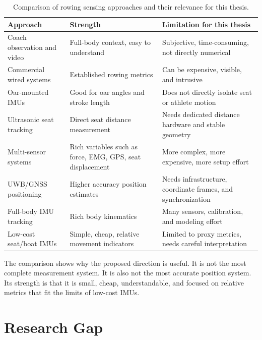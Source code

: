 \begin{table}[htbp]
  \centering
  \caption{Comparison of rowing sensing approaches and their relevance for this thesis.}
  \label{tab:approach-comparison}
  \begin{tabular}{p{} p{} p{}}
    \hline
    Approach & Strength & Limitation for this thesis \\
    \hline
    Coach observation and video & Full-body context, easy to understand & Subjective, time-consuming, not directly numerical \\
    Commercial wired systems & Established rowing metrics & Can be expensive, visible, and intrusive \cite{llosa_remote_2009} \\
    Oar-mounted IMUs & Good for oar angles and stroke length & Does not directly isolate seat or athlete motion \cite{gravenhorst_validation_2013} \\
    Ultrasonic seat tracking & Direct seat distance measurement & Needs dedicated distance hardware and stable geometry \cite{gravenhorst_sonicseat_2012} \\
    Multi-sensor systems & Rich variables such as force, EMG, GPS, seat displacement & More complex, more expensive, more setup effort \cite{hohmuth_wireless_2023} \\
    UWB/GNSS positioning & Higher accuracy position estimates & Needs infrastructure, coordinate frames, and synchronization \cite{rodriguez_mendoza_wearable_2024} \\
    Full-body IMU tracking & Rich body kinematics & Many sensors, calibration, and modeling effort \cite{ruffaldi_sensor_2015} \\
    Low-cost seat/boat IMUs & Simple, cheap, relative movement indicators & Limited to proxy metrics, needs careful interpretation \\
    \hline
  \end{tabular}
\end{table}

The comparison shows why the proposed direction is useful. It is not the most complete measurement system. It is also not the most accurate position system. Its strength is that it is small, cheap, understandable, and focused on relative metrics that fit the limits of low-cost IMUs.

\section{Research Gap}

